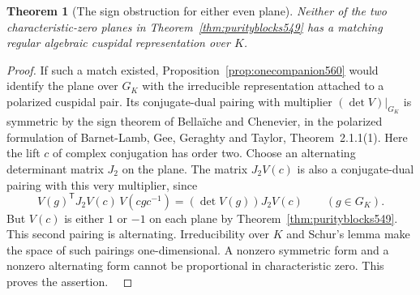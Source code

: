 \documentclass[a4paper,11pt]{article}
\newtheorem{theorem}[proposition]{Theorem}
\theoremstyle{definition}
\theoremstyle{remark}
\numberwithin{equation}{section}
\begin{document}
\begin{theorem}[The sign obstruction for either even plane]
\leavevmode\label{thm:evenplanecompanion560}
Neither of the two characteristic-zero planes in
Theorem~\ref{thm:purityblocks549} has a matching regular
algebraic cuspidal representation over \(K\).
\end{theorem}
\begin{proof}
If such a match existed,
Proposition~\ref{prop:onecompanion560} would identify the plane
over \(G_K\) with the irreducible representation attached to a
polarized cuspidal pair. Its conjugate-dual pairing with
multiplier \((\det V)|_{G_K}\) is symmetric by the sign theorem
of Bella\"iche and Chenevier, in the polarized formulation of
Barnet-Lamb, Gee, Geraghty and Taylor, Theorem~2.1.1(1).
Here the lift \(c\) of complex conjugation has order two.
Choose an alternating determinant matrix \(J_2\) on the plane.
The matrix \(J_2 V(c)\) is also a conjugate-dual pairing with
this very multiplier, since
\[
 V(g)^{\mathsf T}J_2V(c)\,V(cgc^{-1})
           =(\det V(g))J_2 V(c)\qquad(g\in G_K).
\]
But \(V(c)\) is either \(1\) or \(-1\) on each plane by
Theorem~\ref{thm:purityblocks549}. This second pairing is
alternating. Irreducibility over \(K\) and Schur's lemma make
the space of such pairings one-dimensional. A nonzero symmetric
form and a nonzero alternating form cannot be proportional in
characteristic zero. This proves the assertion.
~\cite{XII-IX-sign560,XII-IX-blggt560}
\end{proof}
\end{document}
